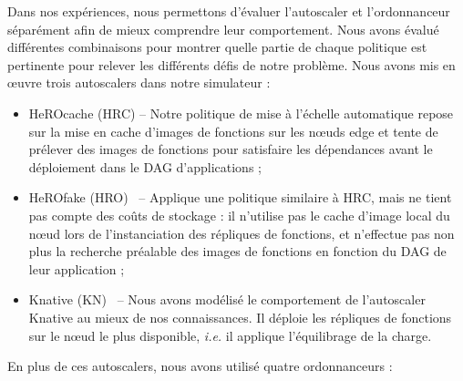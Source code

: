 Dans nos expériences, nous permettons d'évaluer l'autoscaler et l'ordonnanceur séparément afin de mieux comprendre leur comportement. Nous avons évalué différentes combinaisons pour montrer quelle partie de chaque politique est pertinente pour relever les différents défis de notre problème. Nous avons mis en œuvre trois autoscalers dans notre simulateur :

\begin{itemize}
    \item HeROcache (HRC) -- Notre politique de mise à l'échelle automatique repose sur la mise en cache d'images de fonctions sur les nœuds edge et tente de prélever des images de fonctions pour satisfaire les dépendances avant le déploiement dans le DAG d'applications ;
    \item HeROfake (HRO)~\cite{herofake} -- Applique une politique similaire à HRC, mais ne tient pas compte des coûts de stockage : il n'utilise pas le cache d'image local du nœud lors de l'instanciation des répliques de fonctions, et n'effectue pas non plus la recherche préalable des images de fonctions en fonction du DAG de leur application ;
    \item Knative (KN)~\cite{sureshENSUREEfficientScheduling2020} -- Nous avons modélisé le comportement de l'autoscaler Knative au mieux de nos connaissances. Il déploie les répliques de fonctions sur le nœud le plus disponible, \textit{i.e.} il applique l'équilibrage de la charge.
\end{itemize}

En plus de ces autoscalers, nous avons utilisé quatre ordonnanceurs :

